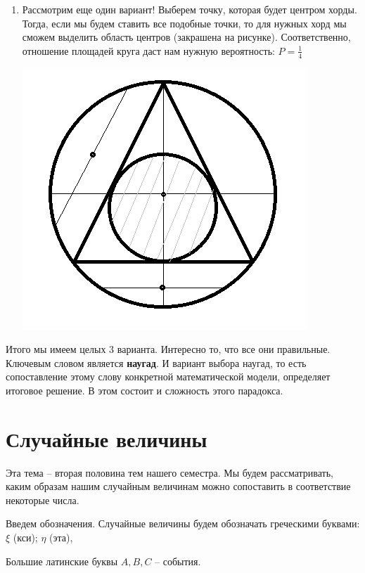 \documentclass{article}
\begin{document}
\begin{enumerate}
\item Рассмотрим еще один вариант! Выберем точку, которая будет центром хорды. Тогда, если мы будем ставить все подобные точки, то для нужных хорд мы сможем выделить область центров (закрашена на рисунке). Соответственно, отношение площадей круга даст нам нужную вероятность: $P = \frac{1}{4}$

\begin{center}
    \includegraphics[scale=0.4]{4.png}
\end{center}

\end{enumerate}

\quad

Итого мы имеем целых 3 варианта. Интересно то, что все они правильные. Ключевым словом является \textbf{наугад}. И вариант выбора наугад, то есть сопоставление этому слову конкретной математической модели, определяет итоговое решение. В этом состоит и сложность этого парадокса.

\section{Случайные величины}

Эта тема -- вторая половина тем нашего семестра. Мы будем рассматривать, каким образам нашим случайным величинам можно сопоставить в соответствие некоторые числа.

Введем обозначения. Случайные величины будем обозначать греческими буквами: $\xi$ (кси); $\eta $ (эта), 

Большие латинские буквы $A, B, C$ -- события.
\end{document}
